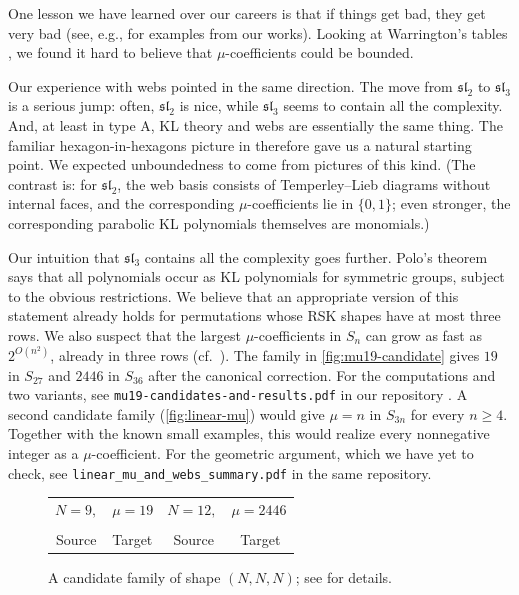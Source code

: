 \documentclass[a4paper,11pt]{amsart}
\makeatletter
\newcommand{\repo}[1]{\nolinkurl{#1}}
\numberwithin{equation}{subsection}
\theoremstyle{plain}
\theoremstyle{definition}
\theoremstyle{remark}
\newcommand{\muExampleWeb}[5]{%
  \begin{tikzpicture}[x=1.82cm,y=1.82cm,line cap=round,line join=round,
    baseline=(current bounding box.center)]
    \foreach \i in {1,...,#1}
      \coordinate (v\i) at ({180-(\i-1)*360/#1}:1);
    \foreach \i/\x/\y in {#2}
      \coordinate (v\i) at (\x,\y);
    \draw[black,line width=.39pt] \foreach \i/\j in {#3}{(v\i)--(v\j)};
    \foreach \i in {1,...,#1}
      \filldraw[draw=black,fill=white,line width=.34pt] (v\i) circle[radius=1.04pt];
    \foreach \i in {#4}
      \fill[black] (v\i) circle[radius=.8pt];
    \foreach \i in {#5}
      \filldraw[draw=black,fill=white,line width=.35pt] (v\i) circle[radius=.69pt];
  \end{tikzpicture}%
}
\newcommand{\muNineSource}{\muExampleWeb{27}{%
28/-0.7658/0.2788,29/-0.4897/0.6577,30/-0.0473/0.8136,31/0.6243/0.5239,32/0.8144/0.0953,
33/0.7282/-0.3659,34/0.1417/-0.8026,35/-0.3248/-0.7529,36/-0.6809/-0.4478,37/0.3229/0.7483,
38/0.2337/0.5417,39/0.4867/-0.6537,40/0.3523/-0.4732,41/-0.8095/-0.0947,42/-0.586/-0.0685%
}{%
3/28,5/29,8/30,11/31,14/32,17/33,20/34,23/35,25/36,38/37,40/39,
42/41,2/28,4/29,7/30,9/37,38/31,13/32,16/33,18/39,40/34,22/35,
1/41,42/36,6/29,10/37,38/30,12/31,15/32,19/39,40/33,21/34,24/35,
26/36,27/41,42/28%
}{%
28,29,30,31,32,33,34,35,36,37,39,41%
}{%
38,40,42%
}}
\newcommand{\muNineTarget}{\muExampleWeb{27}{%
28/0.3135/0.7265,29/0.3259/0.5892,30/0.3616/0.4243,31/0.3989/0.2416,32/0.4281/0.0503,
33/0.4443/-0.1432,34/0.4497/-0.3292,35/0.4529/-0.4984,36/0.4724/-0.6346,37/0.2048/0.6416,
38/0.2816/0.6524,39/0.2081/0.4827,40/0.2983/0.4989,41/0.0605/0.554,42/0.1578/0.5594,
43/0.2291/0.3076,44/0.3297/0.3243,45/0.0665/0.3778,46/0.1681/0.3892,47/-0.0984/0.4562,
48/0.0097/0.4627,49/0.2535/0.1243,50/0.3599/0.1384,51/0.0848/0.1962,52/0.1891/0.2092,
53/-0.0838/0.2697,54/0.0227/0.2811,55/-0.2573/0.3454,56/-0.1465/0.3573,57/0.2756/-0.0622,
58/0.3826/-0.0519,59/0.1059/0.0124,60/0.2118/0.0249,61/-0.0638/0.0854,62/0.0421/0.0978,
63/-0.2346/0.1578,64/-0.1271/0.1708,65/-0.4087/0.2249,66/-0.3/0.2427,67/0.294/-0.2465,
68/0.3956/-0.2395,69/0.1275/-0.1713,70/0.2324/-0.16,71/-0.0422/-0.0978,72/0.0637/-0.0854,
73/-0.2125/-0.0249,74/-0.106/-0.0124,75/-0.3811/0.0443,76/-0.2757/0.0589,77/-0.5481/0.1011,
78/-0.446/0.1232,79/0.3135/-0.4216,80/0.4053/-0.4162,81/0.1518/-0.3524,82/0.2529/-0.34,
83/-0.0195/-0.2816,84/0.087/-0.2686,85/-0.1919/-0.2076,86/-0.0844/-0.1957,87/-0.3606/-0.1314,
88/-0.2546/-0.1211,89/-0.5222/-0.0611,90/-0.4211/-0.0492,91/-0.6735/-0.0124,92/-0.5811/0.0092,
93/0.3475/-0.5773,94/0.4243/-0.5702,95/0.1864/-0.5254,96/0.2827/-0.5081,97/0.0097/-0.4665,
98/0.1162/-0.4481,99/-0.1708/-0.3957,100/-0.06/-0.3811,101/-0.346/-0.313,102/-0.2362/-0.3054,
103/-0.5103/-0.2249,104/-0.4054/-0.2232,105/-0.6584/-0.1432,106/-0.5633/-0.1432,107/-0.7859/-0.0919,
108/-0.706/-0.0827%
}{%
10/28,11/29,12/30,13/31,14/32,15/33,16/34,17/35,18/36,38/37,40/39,
42/41,44/43,46/45,48/47,50/49,52/51,54/53,56/55,58/57,60/59,62/61,
64/63,66/65,68/67,70/69,72/71,74/73,76/75,78/77,80/79,82/81,84/83,
86/85,88/87,90/89,92/91,94/93,96/95,98/97,100/99,102/101,104/103,106/105,
108/107,9/28,8/37,38/29,7/41,42/39,40/30,6/47,48/45,46/43,44/31,
5/55,56/53,54/51,52/49,50/32,4/65,66/63,64/61,62/59,60/57,58/33,
3/77,78/75,76/73,74/71,72/69,70/67,68/34,2/91,92/89,90/87,88/85,
86/83,84/81,82/79,80/35,1/107,108/105,106/103,104/101,102/99,100/97,98/95,
96/93,94/36,19/36,20/93,94/35,21/95,96/79,80/34,22/97,98/81,82/67,
68/33,23/99,100/83,84/69,70/57,58/32,24/101,102/85,86/71,72/59,60/49,
50/31,25/103,104/87,88/73,74/61,62/51,52/43,44/30,26/105,106/89,90/75,
76/63,64/53,54/45,46/39,40/29,27/107,108/91,92/77,78/65,66/55,56/47,
48/41,42/37,38/28%
}{%
28,29,30,31,32,33,34,35,36,37,39,41,43,45,47,49,51,53,55,57,59,61,
63,65,67,69,71,73,75,77,79,81,83,85,87,89,91,93,95,97,99,101,103,105,
107%
}{%
38,40,42,44,46,48,50,52,54,56,58,60,62,64,66,68,70,72,74,76,78,80,
82,84,86,88,90,92,94,96,98,100,102,104,106,108%
}}
\newcommand{\muTwelveSource}{\muExampleWeb{36}{%
37/-0.7872/0.211,38/-0.6282/0.5271,39/-0.2805/0.7705,40/0.071/0.8119,41/0.5763/0.5763,
42/0.7705/0.2805,43/0.8075/-0.1424,44/0.6676/-0.4675,45/0.211/-0.7872,46/-0.1424/-0.8075,
47/-0.5271/-0.6282,48/-0.7386/-0.3445,49/0.3445/0.7386,50/0.2494/0.5347,51/0.4675/-0.6676,
52/0.3384/-0.4833,53/-0.8119/-0.071,54/-0.5878/-0.0514%
}{%
3/37,5/38,8/39,11/40,14/41,17/42,20/43,23/44,26/45,29/46,32/47,
34/48,50/49,52/51,54/53,2/37,4/38,7/39,10/40,12/49,50/41,16/42,
19/43,22/44,24/51,52/45,28/46,31/47,1/53,54/48,6/38,9/39,13/49,
50/40,15/41,18/42,21/43,25/51,52/44,27/45,30/46,33/47,35/48,36/53,
54/37%
}{%
37,38,39,40,41,42,43,44,45,46,47,48,49,51,53%
}{%
50,52,54%
}}
\newcommand{\muTwelveTarget}{\muExampleWeb{36}{%
37/0.3616/0.7757,38/0.3724/0.6778,39/0.4027/0.5573,40/0.4378/0.4211,41/0.4703/0.2746,
42/0.4941/0.1216,43/0.5076/-0.0341,44/0.5108/-0.1892,45/0.5043/-0.3389,46/0.4935/-0.4789,
47/0.4843/-0.6032,48/0.4908/-0.7011,49/0.28/0.7211,50/0.3378/0.7249,51/0.2822/0.6054,
52/0.3524/0.6135,53/0.1681/0.6665,54/0.2438/0.6643,55/0.3/0.474,56/0.38/0.4843,
57/0.1703/0.5341,58/0.2508/0.5378,59/0.0411/0.6065,60/0.1265/0.6022,61/0.3227/0.3319,
62/0.4103/0.3427,63/0.1832/0.393,64/0.2687/0.3995,65/0.047/0.4605,66/0.1335/0.4627,
67/-0.0919/0.5368,68/-0.0011/0.5346,69/0.3438/0.1838,70/0.4362/0.1935,71/0.2/0.2459,
72/0.2886/0.2541,73/0.06/0.3114,74/0.1476/0.3168,75/-0.0805/0.3816,76/0.0087/0.3843,
77/-0.2243/0.4568,78/-0.1319/0.4584,79/0.3605/0.0313,80/0.4541/0.0395,81/0.2162/0.0951,
82/0.307/0.1032,83/0.0746/0.16,84/0.1638/0.167,85/-0.066/0.227,86/0.0227/0.233,
87/-0.2076/0.2962,88/-0.1178/0.3016,89/-0.3524/0.367,90/-0.2616/0.3735,91/0.3703/-0.1211,
92/0.4627/-0.1146,93/0.2292/-0.0562,94/0.32/-0.0487,95/0.0886/0.0076,96/0.1784/0.0157,
97/-0.0514/0.073,98/0.0373/0.0805,99/-0.1908/0.1395,100/-0.1027/0.1465,101/-0.3308/0.2059,
102/-0.2432/0.2141,103/-0.473/0.2697,104/-0.3854/0.2811,105/0.3751/-0.2708,106/0.4632/-0.2665,
107/0.2395/-0.2076,108/0.3286/-0.2,109/0.1011/-0.1449,110/0.1903/-0.1362,111/-0.0378/-0.0805,
112/0.0508/-0.0724,113/-0.1757/-0.0151,114/-0.0881/-0.0076,115/-0.313/0.0503,116/-0.2265/0.0584,
117/-0.4486/0.1135,118/-0.3643/0.1232,119/-0.5838/0.1686,120/-0.5016/0.1838,121/0.3773/-0.4146,
122/0.4584/-0.4108,123/0.2486/-0.3551,124/0.3341/-0.347,125/0.113/-0.2962,126/0.2005/-0.2865,
127/-0.0254/-0.2351,128/0.0627/-0.2254,129/-0.1638/-0.1703,130/-0.0757/-0.1622,131/-0.2995/-0.1038,
132/-0.213/-0.0967,133/-0.4319/-0.0378,134/-0.3481/-0.0303,135/-0.5605/0.0227,136/-0.4805/0.033,
137/-0.6838/0.0697,138/-0.6092/0.087,139/0.3832/-0.547,140/0.4535/-0.5432,141/0.2605/-0.4968,
142/0.3405/-0.4859,143/0.1265/-0.4454,144/0.2119/-0.4324,145/-0.013/-0.3897,146/0.0757/-0.3768,
147/-0.153/-0.3276,148/-0.0638/-0.3173,149/-0.2903/-0.2605,150/-0.2022/-0.253,151/-0.4222/-0.1897,
152/-0.3373/-0.1843,153/-0.5481/-0.1195,154/-0.4676/-0.1157,155/-0.6654/-0.0584,156/-0.5914/-0.0519,
157/-0.7735/-0.0168,158/-0.7076/-0.0016,159/0.4011/-0.6616,160/0.4589/-0.6551,161/0.2816/-0.6276,
162/0.3551/-0.6119,163/0.146/-0.5897,164/0.2292/-0.5713,165/0.0027/-0.5443,166/0.0919/-0.5265,
167/-0.1416/-0.4886,168/-0.0508/-0.474,169/-0.2832/-0.4227,170/-0.1924/-0.413,171/-0.4189/-0.3476,
172/-0.3308/-0.3438,173/-0.5459/-0.2676,174/-0.4622/-0.2681,175/-0.6616/-0.1876,176/-0.5849/-0.1913,
177/-0.7643/-0.1178,178/-0.6973/-0.1211,179/-0.853/-0.0746,180/-0.7968/-0.0697%
}{%
13/37,14/38,15/39,16/40,17/41,18/42,19/43,20/44,21/45,22/46,23/47,
24/48,50/49,52/51,54/53,56/55,58/57,60/59,62/61,64/63,66/65,68/67,
70/69,72/71,74/73,76/75,78/77,80/79,82/81,84/83,86/85,88/87,90/89,
92/91,94/93,96/95,98/97,100/99,102/101,104/103,106/105,108/107,110/109,112/111,
114/113,116/115,118/117,120/119,122/121,124/123,126/125,128/127,130/129,132/131,134/133,
136/135,138/137,140/139,142/141,144/143,146/145,148/147,150/149,152/151,154/153,156/155,
158/157,160/159,162/161,164/163,166/165,168/167,170/169,172/171,174/173,176/175,178/177,
180/179,12/37,11/49,50/38,10/53,54/51,52/39,9/59,60/57,58/55,56/40,
8/67,68/65,66/63,64/61,62/41,7/77,78/75,76/73,74/71,72/69,70/42,
6/89,90/87,88/85,86/83,84/81,82/79,80/43,5/103,104/101,102/99,100/97,
98/95,96/93,94/91,92/44,4/119,120/117,118/115,116/113,114/111,112/109,110/107,
108/105,106/45,3/137,138/135,136/133,134/131,132/129,130/127,128/125,126/123,124/121,
122/46,2/157,158/155,156/153,154/151,152/149,150/147,148/145,146/143,144/141,142/139,
140/47,1/179,180/177,178/175,176/173,174/171,172/169,170/167,168/165,166/163,164/161,
162/159,160/48,25/48,26/159,160/47,27/161,162/139,140/46,28/163,164/141,142/121,
122/45,29/165,166/143,144/123,124/105,106/44,30/167,168/145,146/125,126/107,108/91,
92/43,31/169,170/147,148/127,128/109,110/93,94/79,80/42,32/171,172/149,150/129,
130/111,112/95,96/81,82/69,70/41,33/173,174/151,152/131,132/113,114/97,98/83,
84/71,72/61,62/40,34/175,176/153,154/133,134/115,116/99,100/85,86/73,74/63,
64/55,56/39,35/177,178/155,156/135,136/117,118/101,102/87,88/75,76/65,66/57,
58/51,52/38,36/179,180/157,158/137,138/119,120/103,104/89,90/77,78/67,68/59,
60/53,54/49,50/37%
}{%
37,38,39,40,41,42,43,44,45,46,47,48,49,51,53,55,57,59,61,63,65,67,
69,71,73,75,77,79,81,83,85,87,89,91,93,95,97,99,101,103,105,107,109,111,
113,115,117,119,121,123,125,127,129,131,133,135,137,139,141,143,145,147,149,151,153,155,
157,159,161,163,165,167,169,171,173,175,177,179%
}{%
50,52,54,56,58,60,62,64,66,68,70,72,74,76,78,80,82,84,86,88,90,92,
94,96,98,100,102,104,106,108,110,112,114,116,118,120,122,124,126,128,130,132,134,136,
138,140,142,144,146,148,150,152,154,156,158,160,162,164,166,168,170,172,174,176,178,180%
}}
\newcommand{\MuCandidatePairs}{%
\begin{tabular}{@{}c@{\hspace{1ex}}c@{\hspace{2.5ex}}c@{\hspace{1ex}}c@{}}
  \multicolumn{2}{c}{$N=9,\quad\mu=19$} &
  \multicolumn{2}{c}{$N=12,\quad\mu=2446$}\\[.5ex]
  \muNineSource & \muNineTarget & \muTwelveSource & \muTwelveTarget \\[.3ex]
  {\small Source} & {\small Target} & {\small Source} & {\small Target}
\end{tabular}%
}
\makeatother
\begin{document}
One lesson we have learned over our careers is that if things get
bad, they get very bad (see, e.g., \cite{TorsionProliferation,LinkDetection} 
for examples from our works). Looking at Warrington's tables \cite{Warrington},
we found it hard to believe that $\mu$-coefficients could be bounded.

Our experience with webs pointed in the same direction. The move
from $\mathfrak{sl}_2$ to $\mathfrak{sl}_3$ is a serious jump: often, $\mathfrak{sl}_2$ is nice, while
$\mathfrak{sl}_3$ seems to contain all the complexity.
And, at least in type A, KL theory and webs are essentially the
same thing. The familiar hexagon-in-hexagons picture in \cite{KK} therefore gave us a natural starting
point. We expected unboundedness to come from pictures of this kind. (The contrast is: 
for $\mathfrak{sl}_2$, the web basis consists of Temperley--Lieb
diagrams without internal faces, and the corresponding
$\mu$-coefficients lie in $\{0,1\}$; even stronger, the corresponding parabolic 
KL polynomials themselves are monomials.)

\begin{remark}
Our intuition that $\mathfrak{sl}_3$ contains all the complexity
goes further. Polo's theorem \cite{Polo99} says that all polynomials
occur as KL polynomials for symmetric groups, subject to the obvious
restrictions.
We believe that an appropriate version of this statement already
holds for permutations whose RSK shapes have at most three rows.
We also suspect that the largest $\mu$-coefficients in $S_n$ can grow
as fast as $2^{O(n^2)}$, already in three rows
(cf.~\cite[Lemma~2.8]{Luebeck}). The family in \autoref{fig:mu19-candidate}
gives $19$ in $S_{27}$ and $2446$ in $S_{36}$ after the canonical
correction. For the computations and two variants, see
\repo{mu19-candidates-and-results.pdf} in our repository \cite{GoLaTuVa-mu-code}.
A second candidate family (\autoref{fig:linear-mu}) would give $\mu=n$
in $S_{3n}$ for every $n\ge4$. Together with the known small examples,
this would realize every nonnegative integer as a $\mu$-coefficient.
For the geometric argument, which we have yet to check, see
\repo{linear_mu_and_webs_summary.pdf} in the same repository.
\end{remark}

\begin{figure}[!ht]
\centering
\MuCandidatePairs
\caption{A candidate family of shape $(N,N,N)$; see \cite{GoLaTuVa-mu-code} for details.}
\label{fig:mu19-candidate}
\end{figure}
\end{document}
